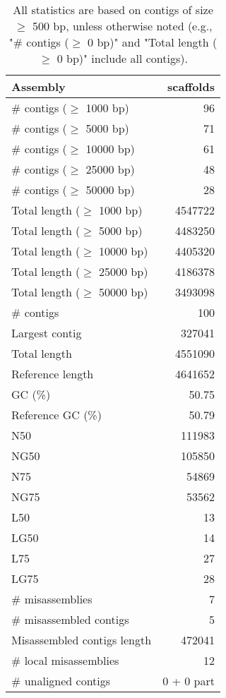 \documentclass[12pt,a4paper]{article}
\begin{document}
\begin{table}[ht]
\begin{center}
\caption{All statistics are based on contigs of size $\geq$ 500 bp, unless otherwise noted (e.g., "\# contigs ($\geq$ 0 bp)" and "Total length ($\geq$ 0 bp)" include all contigs).}
\begin{tabular}{|l*{1}{|r}|}
\hline
Assembly & scaffolds \\ \hline
\# contigs ($\geq$ 1000 bp) & 96 \\ \hline
\# contigs ($\geq$ 5000 bp) & 71 \\ \hline
\# contigs ($\geq$ 10000 bp) & 61 \\ \hline
\# contigs ($\geq$ 25000 bp) & 48 \\ \hline
\# contigs ($\geq$ 50000 bp) & 28 \\ \hline
Total length ($\geq$ 1000 bp) & 4547722 \\ \hline
Total length ($\geq$ 5000 bp) & 4483250 \\ \hline
Total length ($\geq$ 10000 bp) & 4405320 \\ \hline
Total length ($\geq$ 25000 bp) & 4186378 \\ \hline
Total length ($\geq$ 50000 bp) & 3493098 \\ \hline
\# contigs & 100 \\ \hline
Largest contig & 327041 \\ \hline
Total length & 4551090 \\ \hline
Reference length & 4641652 \\ \hline
GC (\%) & 50.75 \\ \hline
Reference GC (\%) & 50.79 \\ \hline
N50 & 111983 \\ \hline
NG50 & 105850 \\ \hline
N75 & 54869 \\ \hline
NG75 & 53562 \\ \hline
L50 & 13 \\ \hline
LG50 & 14 \\ \hline
L75 & 27 \\ \hline
LG75 & 28 \\ \hline
\# misassemblies & 7 \\ \hline
\# misassembled contigs & 5 \\ \hline
Misassembled contigs length & 472041 \\ \hline
\# local misassemblies & 12 \\ \hline
\# unaligned contigs & 0 + 0 part \\ \hline

\end{tabular}
\end{center}
\end{table}
\end{document}
